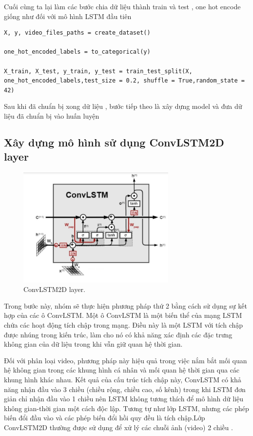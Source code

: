 Cuối cùng ta lại làm các bước chia dữ liệu thành train và test , one hot encode giống như đối với mô hình LSTM đầu tiên 
\begin{lstlisting}[style=codePython]
X, y, video_files_paths = create_dataset()

one_hot_encoded_labels = to_categorical(y)

X_train, X_test, y_train, y_test = train_test_split(X, one_hot_encoded_labels,test_size = 0.2, shuffle = True,random_state = 42)
\end{lstlisting}
Sau khi đã chuẩn bị xong dữ liệu , bước tiếp theo là xây dựng model và đưa dữ liệu đã chuẩn bị vào huấn luyện 
\subsection{Xây dựng mô hình sử dụng ConvLSTM2D layer}
    \begin{figure}[h!]
	\centering
	\includegraphics[width=0.7\textwidth]{Figures/convLSTM2D.jpg}
	\caption[ConvLSTM2D layer .]{ConvLSTM2D layer.}
	\label{convLSTM2D.jpg} 
    \end{figure}
Trong bước này, nhóm sẽ thực hiện phương pháp thứ 2 bằng cách sử dụng sự kết hợp của các ô ConvLSTM. Một ô ConvLSTM là một biến thể của mạng LSTM chứa các hoạt động tích chập trong mạng. Điều này là một LSTM với tích chập được nhúng trong kiến trúc, làm cho nó có khả năng xác định các đặc trưng không gian của dữ liệu trong khi vẫn giữ quan hệ thời gian.

Đối với phân loại video, phương pháp này hiệu quả trong việc nắm bắt mối quan hệ không gian trong các khung hình cá nhân và mối quan hệ thời gian qua các khung hình khác nhau. Kết quả của cấu trúc tích chập này, ConvLSTM có khả năng nhận đầu vào 3 chiều (chiều rộng, chiều cao, số kênh) trong khi LSTM đơn giản chỉ nhận đầu vào 1 chiều nên LSTM không tương thích để mô hình dữ liệu không gian-thời gian một cách độc lập.
Tương tự như lớp LSTM, nhưng các phép biến đổi đầu vào và các phép biến đổi hồi quy đều là tích chập.Lớp ConvLSTM2D thường được sử dụng để xử lý các chuỗi ảnh (video) 2 chiều .


